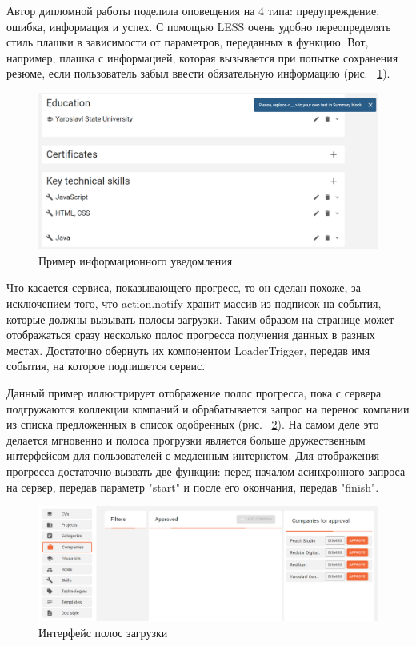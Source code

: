 \documentclass[12pt, a4paper]{diplom}
\begin{document}
Автор дипломной работы поделила оповещения на 4 типа: предупреждение, ошибка, информация и успех. С помощью
LESS очень удобно переопределять стиль плашки в зависимости от параметров, переданных в
функцию. Вот, например, плашка с информацией, которая вызывается при попытке сохранения резюме, если пользователь
забыл ввести обязательную информацию (рис. ~\ref{5}).

\begin{figure}[!ht]
\centering
\includegraphics[width=1\textwidth]{resources/toast.png}
\caption{Пример информационного уведомления}
\label{5}
\end{figure}

Что касается сервиса, показывающего прогресс, то он сделан похоже, за исключением того, что action.notify хранит массив
из подписок на события, которые должны вызывать полосы загрузки. Таким образом на странице может отображаться сразу несколько полос прогресса получения данных в разных местах. Достаточно обернуть их
компонентом LoaderTrigger, передав имя события, на которое подпишется сервис.

Данный пример иллюстрирует отображение полос прогресса, пока с сервера подгружаются коллекции компаний и обрабатывается запрос на перенос компании из списка предложенных в список одобренных (рис. ~\ref{6}).
На самом деле это делается мгновенно и полоса прогрузки является больше дружественным интерфейсом для пользователей с медленным интернетом. Для отображения прогресса достаточно вызвать две функции: перед началом асинхронного запроса на сервер, передав параметр "start" и после его окончания, передав "finish".

\begin{figure}[!ht]
\centering
\includegraphics[width=1\textwidth]{resources/progress.png}
\caption{Интерфейс полос загрузки}
\label{6}
\end{figure}
\end{document}

